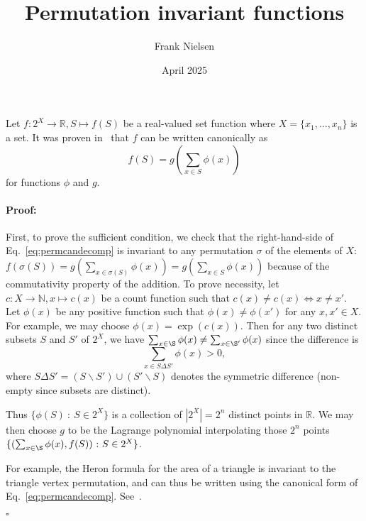 \documentclass{article}
\begin{document}
\def\bbR{\mathbb{R}}
\def\bbN{\mathbb{N}}
\def\st{{\ :\ }}
\newenvironment{proof}{\paragraph{Proof:}}{\hfill$\square$}

\title{Permutation invariant functions}
\author{Frank Nielsen}
 
\date{April 2025}

\maketitle

Let $f: 2^X\rightarrow\bbR,  S\mapsto f(S)$ be a real-valued set function where $X=\{x_1,\ldots, x_n\}$ is a set.
It was proven in~\cite{deepset-2017} that $f$ can be written canonically as
\begin{equation}\label{eq:permcandecomp}
f(S)=g\left(\sum_{x\in S} \phi(x)\right)
\end{equation}
for functions $\phi$ and $g$.

\begin{proof}
First, to prove the sufficient condition, we check that the right-hand-side of Eq.~\ref{eq:permcandecomp} is invariant to any permutation $\sigma$ of the elements of $X$: $f(\sigma(S))=g\left(\sum_{x\in\sigma(S)} \phi(x)\right)=g\left(\sum_{x\in S} \phi(x)\right)$ because of the commutativity property of the addition.
To prove necessity, let $c: X\rightarrow\bbN, x\mapsto c(x)$ be a count function such that $c(x)\not=c(x)\Leftrightarrow x\not=x'$.
Let $\phi(x)$ be any positive function such that $\phi(x)\not=\phi(x')$ for any $x,x'\in X$.
For example, we may choose $\phi(x)=\exp(c(x))$.
Then for any two distinct subsets $S$ and $S'$ of $2^X$, we have $\sum_{x\in\S} \phi(x)\not = \sum_{x\in\S'} \phi(x)$ since the difference is
$$
\sum_{x\in S\Delta S'} \phi(x)>0,
$$
where $S\Delta S'=(S\backslash S')\cup (S'\backslash S)$ denotes the symmetric difference (non-empty since  subsets are distinct).

Thus $\{\phi(S)\st S\in 2^X\}$ is a collection of $|2^X|=2^n$ distinct points in $\bbR$.
We may then choose $g$ to be the Lagrange polynomial interpolating those $2^n$ points $\{(\sum_{x\in\S} \phi(x),f(S))\st S\in 2^X\}$.

For example, the Heron formula for the area of a triangle is invariant to the triangle vertex permutation, and can thus be written using the canonical form of Eq.~\ref{eq:permcandecomp}. See~\cite{DeepSetHeron-2025}.

\end{proof}



\end{document}
